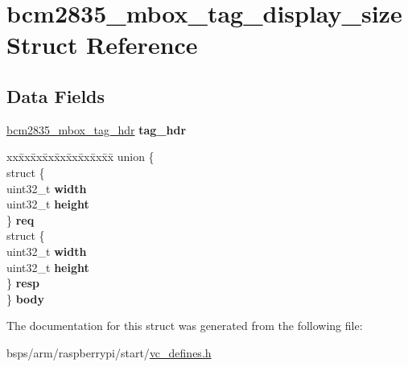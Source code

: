 \hypertarget{structbcm2835__mbox__tag__display__size}{}\section{bcm2835\+\_\+mbox\+\_\+tag\+\_\+display\+\_\+size Struct Reference}
\label{structbcm2835__mbox__tag__display__size}
\subsection*{Data Fields}
\begin{DoxyCompactItemize}
\item 
\mbox{\label{structbcm2835__mbox__tag__display__size_aa5ec85de2e5c818ec84215b14d60a9e6}} 
\mbox{\hyperlink{structbcm2835__mbox__tag__hdr}{bcm2835\+\_\+mbox\+\_\+tag\+\_\+hdr}} {\bfseries tag\+\_\+hdr}
\item 
\mbox{\label{structbcm2835__mbox__tag__display__size_af91078ec3e825d997c1f09f4d0593671}} 
\begin{tabbing}
xx\=xx\=xx\=xx\=xx\=xx\=xx\=xx\=xx\=\kill
union \{\\
\>struct \{\\
\>\>uint32\_t {\bfseries width}\\
\>\>uint32\_t {\bfseries height}\\
\>\} {\bfseries req}\\
\>struct \{\\
\>\>uint32\_t {\bfseries width}\\
\>\>uint32\_t {\bfseries height}\\
\>\} {\bfseries resp}\\
\} {\bfseries body}\\

\end{tabbing}\end{DoxyCompactItemize}


The documentation for this struct was generated from the following file\+:\begin{DoxyCompactItemize}
\item 
bsps/arm/raspberrypi/start/\mbox{\hyperlink{vc__defines_8h}{vc\+\_\+defines.\+h}}\end{DoxyCompactItemize}
